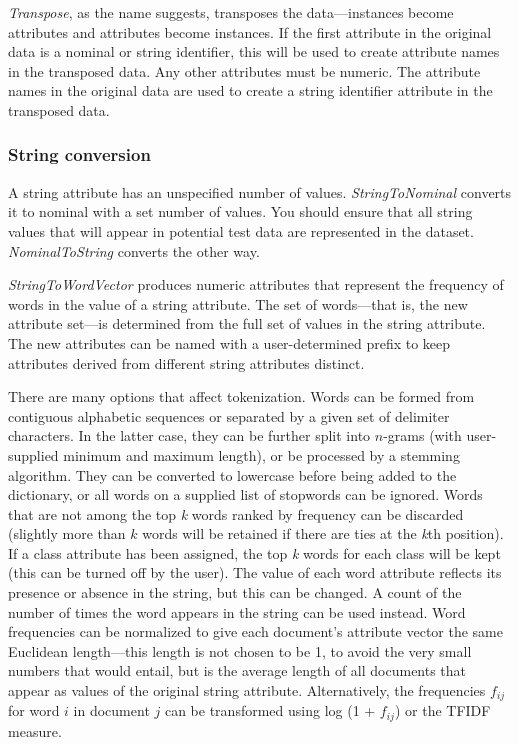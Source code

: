 \textit{Transpose}, as the name suggests, transposes the
data---instances become attributes and attributes become instances. If
the first attribute in the original data is a nominal or string
identifier, this will be used to create attribute names in the
transposed data. Any other attributes must be numeric. The attribute
names in the original data are used to create a string identifier
attribute in the transposed data.

\subsubsection{String conversion}
\label{subsubsection:string_conversion}

A string attribute has an unspecified number of
values. \textit{StringToNominal} converts it to nominal with a set
number of values. You should ensure that all string values that will
appear in potential test data are represented in the
dataset. \textit{NominalToString} converts the other way.

\textit{StringToWordVector} produces numeric attributes that represent
the frequency of words in the value of a string attribute. The set of
words---that is, the new attribute set---is determined from the full set
of values in the string attribute. The new attributes can be named
with a user-determined prefix to keep attributes derived from
different string attributes distinct.

There are many options that affect tokenization. Words can be formed
from contiguous alphabetic sequences or separated by a given set of
delimiter characters. In the latter case, they can be further split
into $n$-grams (with user-supplied minimum and maximum length), or be
processed by a stemming algorithm. They can be converted to lowercase
before being added to the dictionary, or all words on a supplied list
of stopwords can be ignored. Words that are not among the top
\textit{k} words ranked by frequency can be discarded (slightly more
than $k$ words will be retained if there are ties at the \textit{k}th
position). If a class attribute has been assigned, the top \textit{k}
words for each class will be kept (this can be turned off by the
user). The value of each word attribute reflects its presence or
absence in the string, but this can be changed. A count of the number
of times the word appears in the string can be used instead. Word
frequencies can be normalized to give each document's attribute vector
the same Euclidean length---this length is not chosen to be 1, to
avoid the very small numbers that would entail, but is the average
length of all documents that appear as values of the original string
attribute. Alternatively, the frequencies $f_{ij}$ for word $i$ in
document $j$ can be transformed using log (1 + $f_{ij}$) or the TFIDF
measure.

